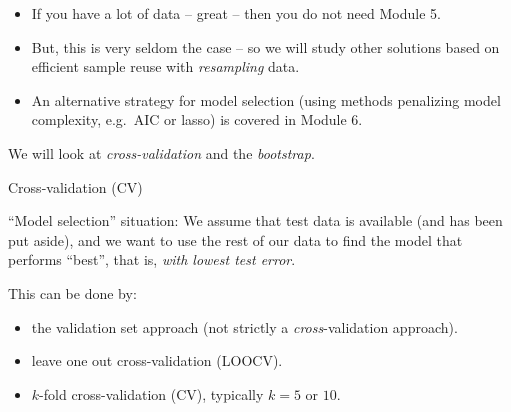 \documentclass[
  10pt,
  ignorenonframetext,
]{beamer}
\providecommand{\tightlist}{%
  \setlength{\itemsep}{0pt}\setlength{\parskip}{0pt}}
\begin{document}
\begin{frame}
\begin{itemize}
\item
  If you have a lot of data -- great -- then you do not need Module 5.
\item
  But, this is very seldom the case -- so we will study other solutions
  based on efficient sample reuse with \emph{resampling} data.
\item
  An alternative strategy for model selection (using methods penalizing
  model complexity, e.g.~AIC or lasso) is covered in Module 6.
\end{itemize}

We will look at \emph{cross-validation} and the \emph{bootstrap}.
\end{frame}

\begin{frame}{Cross-validation (CV)}
\protect\hypertarget{cross-validation-cv}{}
\(~\)

``Model selection'' situation: We assume that test data is available
(and has been put aside), and we want to use the rest of our data to
find the model that performs ``best'', that is, \emph{with lowest test
error}.

\vspace{2mm}

This can be done by:

\begin{itemize}
\tightlist
\item
  the validation set approach (not strictly a \emph{cross}-validation
  approach).
\item
  leave one out cross-validation (LOOCV).
\item
  \(k\)-fold cross-validation (CV), typically \(k=5\) or \(10\).
\end{itemize}
\end{frame}
\end{document}
